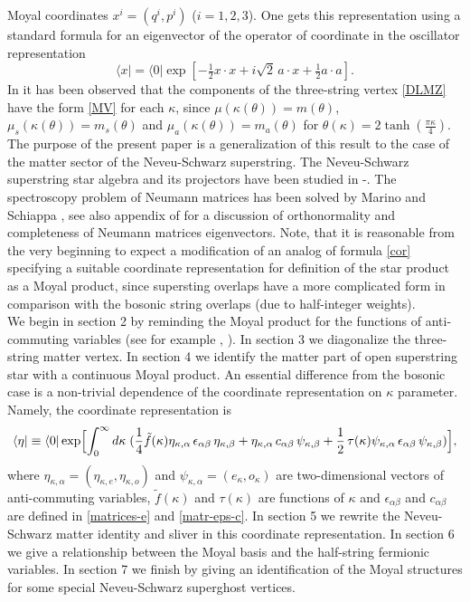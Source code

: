\documentclass[a4paper,12pt]{article}
\begin{document}
Moyal coordinates $x^i=(q^i,p^i)$ ($i=1,2,3$).
One gets this representation using a standard formula for
an eigenvector of the operator
of coordinate in the oscillator representation
\begin{equation}
\label{cor}
\langle x|=\langle 0| \exp [ - \tfrac12 x \cdot
x + i\sqrt{2}\, a \cdot x + \tfrac12 a\cdot a].
\end{equation}
In \cite{0202087} it has been
observed that the components of the three-string vertex
\eqref{DLMZ} have the form
\eqref{MV} for each $\kappa$,
since $\mu(\kappa(\theta))=m(\theta)$,
$\mu_s(\kappa(\theta))=m_s(\theta)$ and $\mu_a(\kappa(\theta))=m_a(\theta)$
for $\theta(\kappa)=2\tanh (\frac{\pi\kappa}{4})$.\\


The purpose of the present paper is a generalization of this result to
the case of the matter sector of the Neveu-Schwarz  superstring.
The Neveu-Schwarz superstring star algebra and its projectors
have been studied in \cite{0112214}-\cite{0204138}.
The spectroscopy problem of Neumann matrices has been solved by Marino and
Schiappa \cite{0112231}, see also appendix of \cite{0203227} for a discussion
of orthonormality and completeness of Neumann matrices eigenvectors.
Note, that it is reasonable
from the very beginning to expect a modification of an analog of
formula \eqref{cor} specifying a suitable coordinate representation
for definition of  the star product as a Moyal product, since supersting
overlaps have a more complicated form in comparison with the
bosonic string overlaps (due to half-integer weights).\\


We begin in section 2 by reminding  the Moyal product
for the functions of anti-commuting variables (see for example
\cite{0002084}, \cite{Berezin}). In section 3 we diagonalize the
three-string matter vertex. In section 4
we identify the matter part of
open superstring star with a continuous Moyal product.
An essential difference from the bosonic case is a
non-trivial dependence of the coordinate representation on
$\kappa$ parameter. Namely, the coordinate representation is
\begin{gather}
\langle \eta|\equiv\langle 0|\exp\Bigl[\int_{0}^{\infty}d\kappa\;
(\frac14 \tilde{f}(\kappa)\eta_{\kappa,\alpha}\,\epsilon_{\alpha\beta}\,
\eta_{\kappa,\beta}
+\eta_{\kappa,\alpha}\,c_{\alpha\beta}\,
\psi_{\kappa,\beta}
+\frac12\,\tau(\kappa)\psi_{\kappa,\alpha}\,\epsilon_{\alpha\beta}\,
\psi_{\kappa,\beta}
)\Bigr],
\end{gather}
where $\eta_{\kappa,\alpha}=(\eta_{\kappa,e},\eta_{\kappa,o})$ and
$\psi_{\kappa,\alpha}=(e_{\kappa},o_{\kappa})$ are two-dimensional
vectors of anti-commuting variables, $\tilde{f}(\kappa)$
and $\tau(\kappa)$ are functions of $\kappa$
and $\epsilon_{\alpha\beta}$ and $c_{\alpha\beta}$
are defined in \eqref{matrices-e} and \eqref{matr-eps-c}. In section 5 we
rewrite the Neveu-Schwarz matter identity and sliver in this
coordinate representation. In section 6 we give a relationship
between the Moyal basis and the half-string fermionic variables.
In section 7 we finish by giving an identification of the Moyal
structures for some special Neveu-Schwarz superghost vertices.
\end{document}
